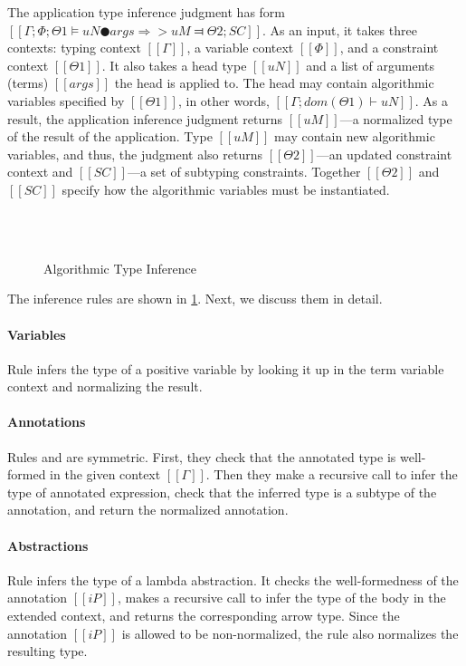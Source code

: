 The application type inference judgment has form 
$[[Γ ; Φ ; Θ1 ⊨ uN ● args ⇒> uM ⫤ Θ2 ; SC]]$.
As an input, it takes three contexts: typing context $[[Γ]]$, a variable context $[[Φ]]$,
and a constraint context $[[Θ1]]$. It also takes a head type $[[uN]]$ and 
a list of arguments (terms) $[[args]]$ the head is applied to.
The head may contain algorithmic variables specified by $[[Θ1]]$, 
in other words, $[[Γ; dom(Θ1) ⊢ uN]]$.
As a result, the application inference judgment returns 
$[[uM]]$---a normalized type of the result of the application.
Type $[[uM]]$ may contain new algorithmic variables, and thus, 
the judgment also returns $[[Θ2]]$---an updated constraint context
and $[[SC]]$---a set of subtyping constraints.
Together $[[Θ2]]$  and $[[SC]]$ specify how the algorithmic variables 
must be instantiated.


\begin{figure}
  \ottdefnATPInfLabeled{}
  \hfill \\
  \ottdefnATNInfLabeled{}
  \hfill \\
  \ottdefnATSpinInfLabeled{}
  \caption{Algorithmic Type Inference}
  \label{fig:type-inference}
\end{figure}


The inference rules are shown in
\cref{fig:type-inference}.
Next, we discuss them in detail.

\paragraph{Variables}
  Rule  
  infers the type of a positive variable by looking it up in the 
  term variable context and normalizing the result.

\paragraph{Annotations}
  Rules  and 
  are symmetric.
  First, they check that the annotated type is well-formed in the 
  given context $[[Γ]]$. Then they make a recursive call to infer the 
  type of annotated expression, check that the inferred type is a subtype of 
  the annotation, and return the normalized annotation.

\paragraph{Abstractions}
  Rule  infers the type of a lambda abstraction.
  It checks the well-formedness of the annotation $[[iP]]$,
  makes a recursive call to infer the type of the body in the extended context, 
  and returns the corresponding arrow type.
  Since the annotation $[[iP]]$ is allowed to be non-normalized,
  the rule also normalizes the resulting type.

